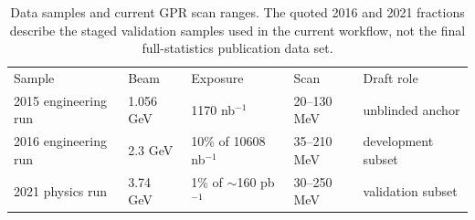\begin{table}[t]
\caption{\label{tab:dataset-summary}Data samples and current GPR scan ranges. The
quoted 2016 and 2021 fractions describe the staged validation samples used in the
current workflow, not the final full-statistics publication data set.}
\begin{ruledtabular}
\begin{tabular}{lllll}
Sample & Beam & Exposure & Scan & Draft role \\
2015 engineering run & 1.056 GeV & 1170 nb$^{-1}$ & 20--130 MeV & unblinded anchor \\
2016 engineering run & 2.3 GeV & 10\% of 10608 nb$^{-1}$ & 35--210 MeV & development subset \\
2021 physics run & 3.74 GeV & 1\% of $\sim$160 pb$^{-1}$ & 30--250 MeV & validation subset \\
\end{tabular}
\end{ruledtabular}
\end{table}
